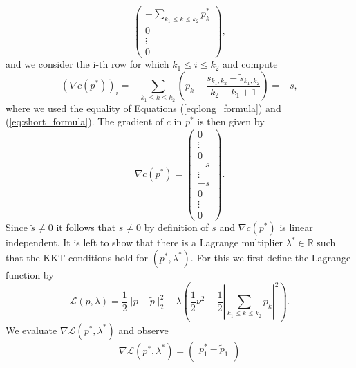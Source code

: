 \documentclass[abstracton]{scrreprt}
\newenvironment{proof}[1][Proof]{\begin{trivlist}
\item[\hskip \labelsep {\bfseries #1}]}{\end{trivlist}}
\begin{document}
\begin{proof}
$$\begin{pmatrix}
                            - \sum\limits_{k_{1} \le k \le k_{2}} p^{\ast}_{k} \\
                            0 \\
                            \vdots \\
                            0
                        \end{pmatrix},
                $$
            and we consider the i-th row for which $k_{1} \le i \le k_{2}$ and compute
                $$
                    (\nabla c(p^{\ast}))_{i} = - \sum_{k_{1} \le k \le k_{2}} \left( \tilde{p}_{k} + \frac{s_{k_{1}, k_{2}} - \tilde{s}_{k_{1}, k_{2}}}{k_{2} - k_{1} + 1} \right) = -s,
                $$
            where we used the equality of Equations (\ref{eq:long_formula}) and (\ref{eq:short_formula}). The gradient of $c$ in $p^{\ast}$ is then given by
                $$
                    \nabla c(p^{\ast}) =
                    \begin{pmatrix}
                            0 \\
                            \vdots \\
                            0 \\
                            - s \\
                            \vdots \\
                            - s \\
                            0 \\
                            \vdots \\
                            0
                        \end{pmatrix}.
                $$
            Since $\tilde{s} \neq 0$ it follows that $s \neq 0$ by definition of $s$ and $\nabla c(p^{\ast})$ is linear independent. It is left to show that there is a Lagrange multiplier $\lambda^{\ast} \in \mathbb{R}$ such that the KKT conditions hold for $(p^{\ast}, \lambda^{\ast})$. For this we first define the Lagrange function by
                $$
                    \mathcal{L}(p, \lambda) = \frac{1}{2} ||p - \tilde{p}||_{2}^{2} - \lambda \left( \frac{1}{2} \nu^{2} - \frac{1}{2} \left| \sum_{k_{1} \le k \le k_{2}} p_{k} \right|^{2} \right).
                $$
            We evaluate $\nabla \mathcal{L}(p^{\ast}, \lambda^{\ast})$ and observe
                $$
                    \nabla \mathcal{L}(p^{\ast}, \lambda^{\ast}) =
                        \begin{pmatrix}
                            p^{\ast}_{1} - \tilde{p}_{1} \\

\end{pmatrix}$$
\end{proof}
\end{document}
